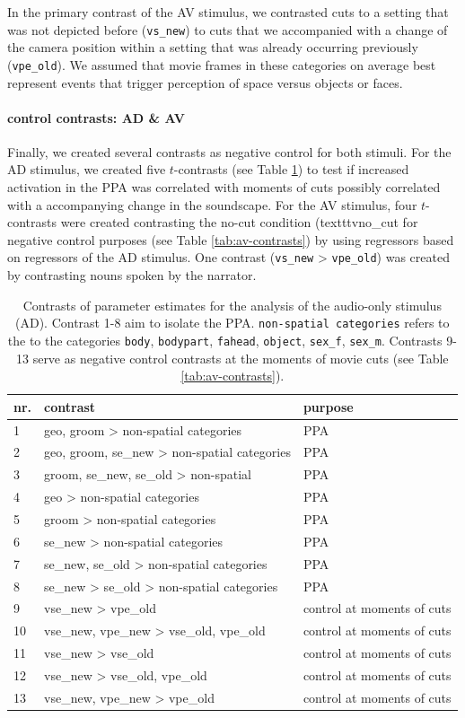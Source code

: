 \documentclass[english]{article}
\begin{document}
In the primary contrast of the AV stimulus, we contrasted cuts to a setting that
was not depicted before (\texttt{vs\_new}) to cuts that we accompanied with a
change of the camera position within a setting that was already occurring
previously (\texttt{vpe\_old}).
We assumed that movie frames in these categories on average best represent
events that trigger perception of space versus objects or faces.

\paragraph{control contrasts: AD \& AV}

Finally, we created several contrasts as negative control for both stimuli.
For the AD stimulus, we created five $t$-contrasts (see Table
\ref{tab:ao-contrasts}) to test if increased activation in the PPA was
correlated with moments of cuts possibly correlated with a accompanying change
in the soundscape.
For the AV stimulus, four $t$-contrasts were created contrasting the no-cut
condition (texttt{vno\_cut} for negative control purposes (see Table
\ref{tab:av-contrasts}) by using regressors based on regressors of the AD
stimulus. One contrast (\texttt{vs\_new} > \texttt{vpe\_old})  was created by
contrasting nouns spoken by the narrator.


\begin{table}[h!]
\caption{Contrasts of parameter estimates for the analysis of the audio-only
    stimulus (AD).
    Contrast 1-8 aim to isolate the PPA.
    \texttt{non-spatial categories} refers to the to the categories
    \texttt{body}, \texttt{bodypart}, \texttt{fahead},
    \texttt{object}, \texttt{sex\_f}, \texttt{sex\_m}.
    Contrasts 9-13 serve as negative control contrasts at the moments of movie
    cuts (see Table \ref{tab:av-contrasts}).}
\label{tab:ao-contrasts}
\footnotesize
\begin{tabular}{lll}
\toprule
\textbf{nr.} &  \textbf{contrast} & \textbf{purpose} \\
\midrule
1 & geo, groom > non-spatial categories & PPA \tabularnewline
2 & geo, groom, se\_new > non-spatial categories & PPA \tabularnewline
3 & groom, se\_new, se\_old > non-spatial  & PPA \tabularnewline
4 & geo > non-spatial categories & PPA \tabularnewline
5 & groom > non-spatial categories & PPA \tabularnewline
6 & se\_new > non-spatial categories & PPA \tabularnewline
7 & se\_new, se\_old > non-spatial categories & PPA \tabularnewline
8 & se\_new > se\_old > non-spatial categories & PPA \tabularnewline
9 & vse\_new > vpe\_old & control at moments of cuts \tabularnewline
10 & vse\_new, vpe\_new > vse\_old, vpe\_old & control at moments of cuts \tabularnewline
11 & vse\_new > vse\_old & control at moments of cuts \tabularnewline
12 & vse\_new > vse\_old, vpe\_old & control at moments of cuts \tabularnewline
13 & vse\_new, vpe\_new > vpe\_old & control at moments of cuts \tabularnewline
\end{tabular}
\end{table}
\end{document}
